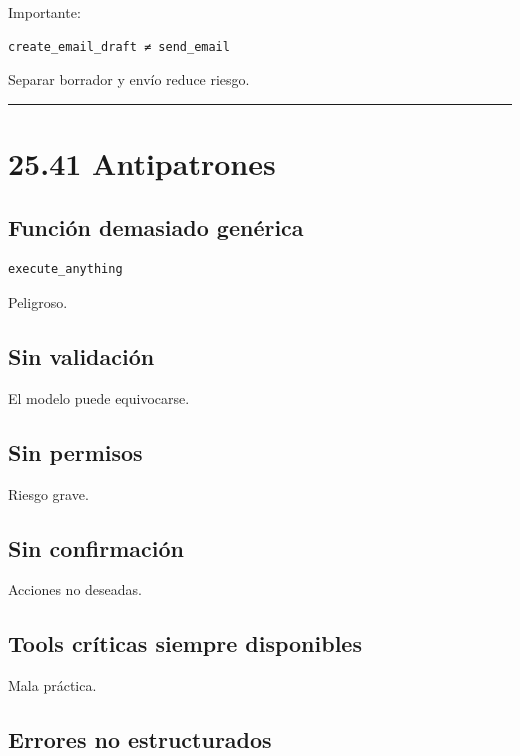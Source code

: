 Importante:

\begin{lstlisting}
create_email_draft ≠ send_email
\end{lstlisting}

Separar borrador y envío reduce riesgo.

\begin{center}\rule{0.5\linewidth}{0.5pt}\end{center}

\section{25.41 Antipatrones}\label{antipatrones-14}

\subsection{Función demasiado
genérica}\label{funciuxf3n-demasiado-genuxe9rica}

\begin{lstlisting}
execute_anything
\end{lstlisting}

Peligroso.

\subsection{Sin validación}\label{sin-validaciuxf3n}

El modelo puede equivocarse.

\subsection{Sin permisos}\label{sin-permisos-3}

Riesgo grave.

\subsection{Sin confirmación}\label{sin-confirmaciuxf3n-1}

Acciones no deseadas.

\subsection{Tools críticas siempre
disponibles}\label{tools-cruxedticas-siempre-disponibles}

Mala práctica.

\subsection{Errores no estructurados}\label{errores-no-estructurados}

